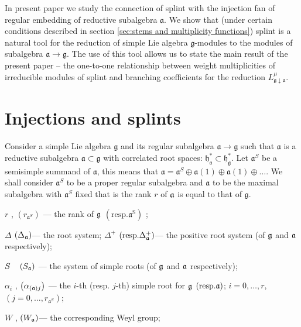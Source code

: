 \documentclass[12pt]{article}
\newcommand{\gf}{\mathfrak{g}}
\newcommand{\af}{\mathfrak{a}}
\begin{document}
In present paper we study the connection of splint with the injection fan of regular embedding of reductive subalgebra ${\mathfrak a}$. We show that (under certain conditions described in section \ref{sec:stems and multiplicity functions}) splint is a natural tool for the reduction of simple Lie algebra $\gf$-modules to the modules of subalgebra $\af\rightarrow\gf$. The use of this tool allows us to state the main result of the present paper -- the one-to-one relationship between weight multiplicities of irreducible modules of splint and branching coefficients for the reduction $L^{\mu}_{{\mathfrak g}\downarrow {\mathfrak a}}$.

\section{Injections and splints}
\label{sec:Injections and splints}

Consider a simple Lie algebra $\mathfrak{g}$ and its regular
subalgebra $\mathfrak{a}\longrightarrow \mathfrak{g%
}$ such that $\mathfrak{a}$ is a reductive subalgebra $\mathfrak{a
\subset g}$ with correlated root spaces:
$\mathfrak{h}_{\mathfrak{a}}^{\ast }\subset
\mathfrak{h}_{\mathfrak{g }}^{\ast }$. Let $\mathfrak{a}^S$ be a
semisimple summand of $\mathfrak{a}$, this means that
$\mathfrak{a}=\mathfrak{a}^S \oplus \mathfrak{a}(1)\oplus
\mathfrak{a}(1)\oplus \dots$. We shall consider $\mathfrak{a}^S$
to be a proper regular subalgebra and $\mathfrak{a}$ to be the
maximal subalgebra with $\mathfrak{a}^S$ fixed that is the rank
$r$ of $\frak{a}$ is equal to that of $\mathfrak{g}$.


$r$ , $\left( r_{\mathfrak{a}^S}\right) $ --- the rank of
$\frak{g}$ $\left( \mathrm{{resp. }\mathfrak{a}^S}\right) $ ;

$\Delta $ $\left( \Delta _{\frak{a}}\right) $--- the root system;
$\Delta ^{+} $ $\left( \mathrm{{resp. }\Delta
_{\frak{a}}^{+}}\right) $--- the positive root system (of
$\frak{g}$ and $\frak{a}$ respectively);

$S\quad \left( S_{\frak{a}}\right) $ --- the system of simple roots (of $%
\frak{g}$ and $\frak{a}$ respectively);

$\alpha _{i}$ , $\left( \alpha _{\left( \frak{a}\right) j}\right) $ --- the $%
i$-th (resp. $j$-th) simple root for $\frak{g}$ $\left( \mathrm{{resp.}\frak{a%
}}\right) $; $i=0,\ldots ,r$,\ \ $\left( j=0,\ldots
,r_{\mathfrak{a}^S}\right) $;

$W$ , $\left( W_{\frak{a}}\right) $--- the corresponding Weyl
group;
\end{document}
